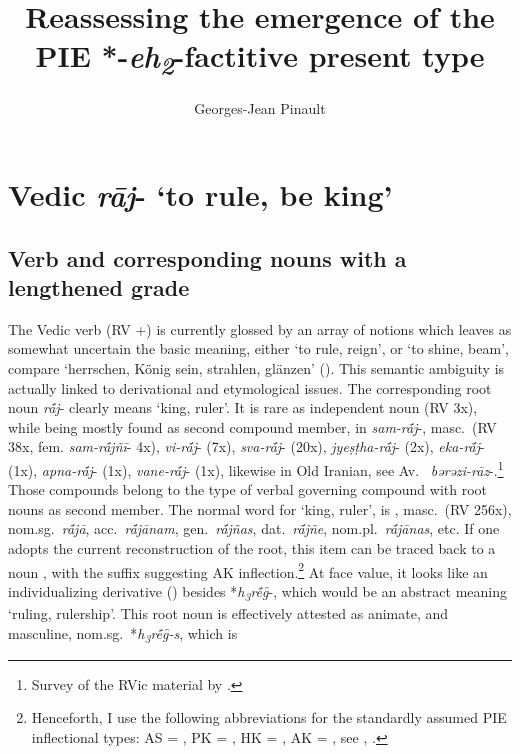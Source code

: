 \documentclass[output=paper,colorlinks,citecolor=brown]{langscibook}
\author{Georges-Jean Pinault\orcid{}\affiliation{École Pratique des Haute Études, Paris}}
\title{Reassessing the emergence of the PIE *-\emph{eh\textsubscript{2}}-factitive present type}
\begin{document}
\maketitle


 
\section{Vedic \textit{rāj}- ‘to rule, be king’}
\subsection{Verb and corresponding nouns with a lengthened grade} 

The Vedic verb  (RV +) is currently glossed by an array of notions which leaves as somewhat uncertain the basic meaning, either ‘to rule, reign’, or ‘to shine, beam’, compare ‘herrschen, König sein, strahlen, glänzen’ (). This semantic ambiguity is actually linked to derivational and etymological issues. The corresponding root noun \textit{rā́j}-  clearly means ‘king, ruler’. It is rare as independent noun (RV 3x), while being mostly found as second compound member, in \textit{sam-rā́j}-,  masc.\ (RV 38x, fem. \textit{sam-rā́jñī}-  4x), \textit{vi-rā́j}-  (7x), \textit{sva-rā́j}-  (20x), \textit{jyeṣṭha-rā́j}-  (2x), \textit{eka-rā́j}-  (1x), \textit{apna-rā́j}-  (1x), \textit{vane-rā́j}-  (1x), likewise in Old Iranian, see Av.\  \textit{bǝrǝzi-rāz}-.\footnote{Survey of the RVic material by \citet[446--451]{Scarlata1999}.} Those compounds belong to the type of verbal governing compound with root nouns as second member. The normal word for `king, ruler', is , masc.\ (RV 256x), nom.sg.\ \textit{rā́jā}, acc.\ \textit{rā́jānam}, gen.\ \textit{rā́j}\textit{ñ}\textit{as}, dat.\ \textit{rā́j}\textit{ñ}\textit{e},  nom.pl.\ \textit{rā́jānas}, etc. If one adopts the current reconstruction of the root, this item can be traced back to a noun , with the suffix suggesting AK   inflection.\footnote{Henceforth, I use the following abbreviations for the standardly assumed PIE inflectional types: AS = , PK = , HK = , AK = , see \citet{Widmer2004}, \citet{Fortson2010}.}  At face value, it looks like an individualizing derivative () besides *\textit{h\textsubscript{3}rḗg̑}-, which would be an abstract meaning ‘ruling, rulership’. This root noun is effectively attested as animate, and masculine, nom.sg.\ *\textit{h\textsubscript{3}rḗg̑-s}, which is 
\end{document}

